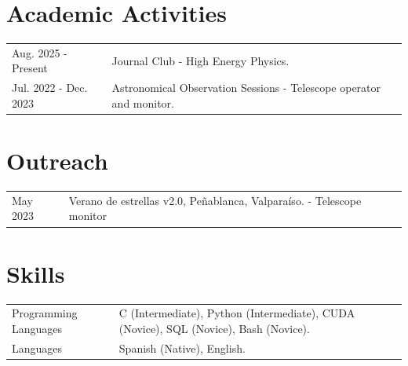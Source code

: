 \documentclass[a4paper,12pt]{article}
\begin{document}
\section{Academic Activities}
\begin{tabularx}{\linewidth}{@{}l X@{}}
Aug. 2025 - Present & Journal Club - High Energy Physics. \\ 

Jul. 2022 - Dec. 2023 & Astronomical Observation Sessions - Telescope operator and monitor.\\
\end{tabularx}

\section{Outreach}
\begin{tabularx}{\linewidth}{@{}l X@{}}

May 2023 & Verano de estrellas v2.0, Peñablanca, Valparaíso. - Telescope monitor
\end{tabularx}

\section{Skills}
\begin{tabularx}{\linewidth}{@{}l X@{}}
Programming Languages &  \normalsize{C (Intermediate), Python (Intermediate), CUDA (Novice), SQL (Novice), Bash (Novice).}\\
Languages  &  \normalsize{Spanish (Native), English.}\\  
\end{tabularx}

\vfill
{}
\end{document}
